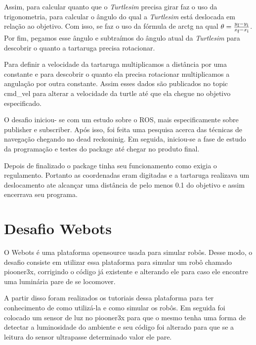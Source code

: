 Assim, para calcular quanto que o \textit{Turtlesim} precisa girar faz o uso da trigonometria, para calcular o ângulo do qual a \textit{Turtlesim} está deslocada  em relação ao objetivo. Com isso, se faz o uso da fórmula de arctg na qual $\theta = \frac{y\textsubscript{f} - y\textsubscript{i}}{x\textsubscript{f} - x\textsubscript{i}} $. Por fim, pegamos esse ângulo e subtraímos do ângulo atual da \textit{Turtlesim} para descobrir o quanto a tartaruga precisa rotacionar.

Para definir a velocidade da tartaruga multiplicamos a distância por uma constante e para descobrir o quanto ela precisa rotacionar multiplicamos a angulação por outra constante. Assim esses dados são publicados no topic cmd\_vel para alterar a velocidade da turtle até que ela chegue no objetivo
especificado.


O desafio iniciou- se com um estudo sobre o ROS, mais especificamente sobre publisher e subscriber. Após isso, foi feita uma pesquisa acerca das técnicas de navegação chegando no dead reckoninig. Em seguida, iniciou-se a fase de estudo da programação e testes do package até chegar no produto final.


Depois de finalizado o package tinha seu funcionamento como exigia o regulamento. Portanto as coordenadas eram digitadas e a tartaruga realizava um deslocamento ate alcançar uma distância de pelo menos 0.1 do objetivo e assim encerrava seu programa.

\section{Desafio Webots}

O Webots é uma plataforma opensource usada para simular robôs. Desse modo, o desafio consiste em utilizar essa plataforma para simular um robô chamado piooner3x, corrigindo o código já existente e alterando ele para caso ele encontre uma luminária pare de se locomover.

A partir disso foram realizados os tutoriais dessa plataforma para ter conhecimento de como utilizá-la e como simular os robôs. Em seguida foi colocado um sensor de luz no piooner3x para que o mesmo tenha uma forma de detectar a luminosidade do ambiente e seu código foi alterado para que se a leitura do sensor ultrapasse determinado valor ele pare.

